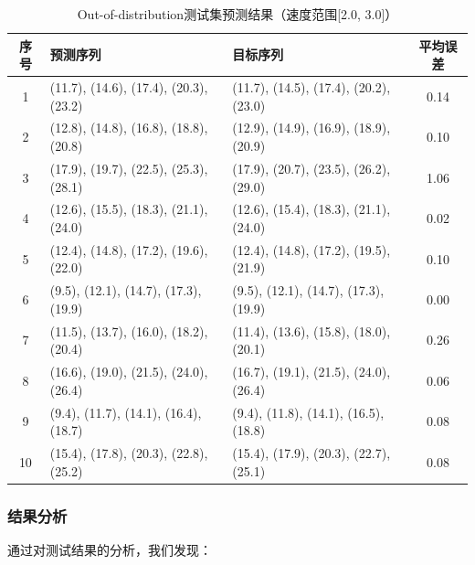 \documentclass[a4paper, 12pt]{article}
\begin{document}
\begin{table}[!h]
    \centering
    \caption{Out-of-distribution测试集预测结果（速度范围[2.0, 3.0]）}
    \label{tab:out_dist_results}
    \small
    \begin{tabular}{|c|l|l|c|}
        \hline
        \textbf{序号} & \textbf{预测序列} & \textbf{目标序列} & \textbf{平均误差} \\
        \hline
        1 & (11.7), (14.6), (17.4), (20.3), (23.2) & (11.7), (14.5), (17.4), (20.2), (23.0) & 0.14 \\
        2 & (12.8), (14.8), (16.8), (18.8), (20.8) & (12.9), (14.9), (16.9), (18.9), (20.9) & 0.10 \\
        3 & (17.9), (19.7), (22.5), (25.3), (28.1) & (17.9), (20.7), (23.5), (26.2), (29.0) & 1.06 \\
        4 & (12.6), (15.5), (18.3), (21.1), (24.0) & (12.6), (15.4), (18.3), (21.1), (24.0) & 0.02 \\
        5 & (12.4), (14.8), (17.2), (19.6), (22.0) & (12.4), (14.8), (17.2), (19.5), (21.9) & 0.10 \\
        6 & (9.5), (12.1), (14.7), (17.3), (19.9) & (9.5), (12.1), (14.7), (17.3), (19.9) & 0.00 \\
        7 & (11.5), (13.7), (16.0), (18.2), (20.4) & (11.4), (13.6), (15.8), (18.0), (20.1) & 0.26 \\
        8 & (16.6), (19.0), (21.5), (24.0), (26.4) & (16.7), (19.1), (21.5), (24.0), (26.4) & 0.06 \\
        9 & (9.4), (11.7), (14.1), (16.4), (18.7) & (9.4), (11.8), (14.1), (16.5), (18.8) & 0.08 \\
        10 & (15.4), (17.8), (20.3), (22.8), (25.2) & (15.4), (17.9), (20.3), (22.7), (25.1) & 0.08 \\
        \hline
    \end{tabular}
\end{table}

\subsubsection{结果分析}
通过对测试结果的分析，我们发现：
\end{document}
